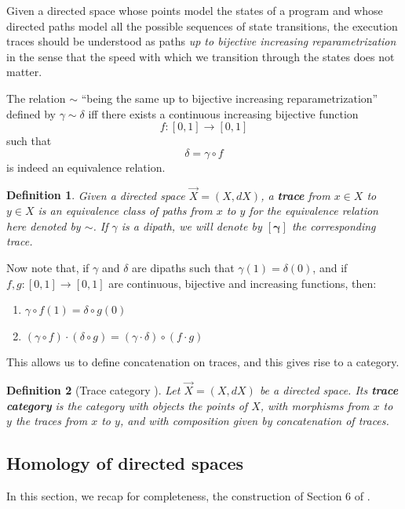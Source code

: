 \documentclass[a4paper,fleqn]{cas-sc}
\newtheorem{dfnt}{Definition}%
\begin{document}
Given a directed space whose points model the states of a program and whose directed paths model all the possible sequences of state transitions, the execution traces should be understood as paths \textit{up to bijective increasing reparametrization} \cite{grandisbook} in the sense that the speed with which we transition through the states does not matter. 

The relation $\sim$ ``being the same up to bijective increasing reparametrization'' defined by
$\gamma \sim \delta$  iff there exists a continuous increasing bijective function 
\[f : [0,1] \to [0,1]\]
\noindent such that
\[\delta = \gamma \circ f \]
is indeed an equivalence relation.

\begin{dfnt}
Given a directed space $\Vec{X} = (X, dX)$, a \textbf{trace} from $x \in X$ to $y \in X$ is an equivalence class of paths from $x$ to $y$ for the equivalence relation here denoted by $\sim$.
If $\gamma$ is a dipath, we will denote by $\mathbf{[\gamma]}$ the corresponding trace.
\end{dfnt}

Now note that, if $\gamma$ and $\delta$ are dipaths such that $\gamma(1) = \delta(0)$, and if $f, g : [0,1] \to [0,1]$ are continuous, bijective and increasing functions, then:
\begin{enumerate}
    \item $\gamma \circ f (1) = \delta \circ g (0)$
    \item $(\gamma \circ f) \cdot  (\delta \circ g) = (\gamma \cdot \delta) \circ (f \cdot g)$
\end{enumerate}

This allows us to define concatenation on traces, and this gives rise to a category.
\begin{dfnt}[Trace category \cite{thebook}]
Let $\Vec{X} = (X, dX)$ be a directed space. Its \textbf{trace category} is the category with objects the points of $X$, with morphisms from $x$ to $y$ the traces from $x$ to $y$, and with composition given by concatenation of traces.
\end{dfnt}

\subsection{Homology of directed spaces}

In this section, we recap for completeness, the construction of Section 6 of \cite{semi-ab}. 
\end{document}
